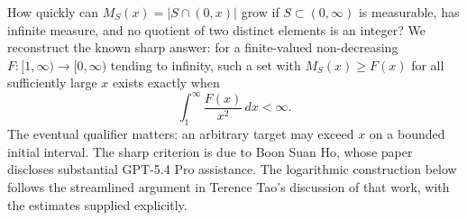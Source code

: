 How quickly can $M_S(x)=|S\cap(0,x)|$ grow if $S\subset(0,\infty)$ is measurable, has infinite measure, and no quotient of two distinct elements is an integer? We reconstruct the known sharp answer: for a finite-valued non-decreasing $F:[1,\infty)\to[0,\infty)$ tending to infinity, such a set with $M_S(x)\ge F(x)$ for all sufficiently large $x$ exists exactly when
\[
 \int_1^\infty\frac{F(x)}{x^2}\,dx<\infty. \tag{1}
\]
The eventual qualifier matters: an arbitrary target may exceed $x$ on a bounded initial interval. The sharp criterion is due to Boon Suan Ho, whose paper discloses substantial GPT-5.4 Pro assistance. The logarithmic construction below follows the streamlined argument in Terence Tao's discussion of that work, with the estimates supplied explicitly.
